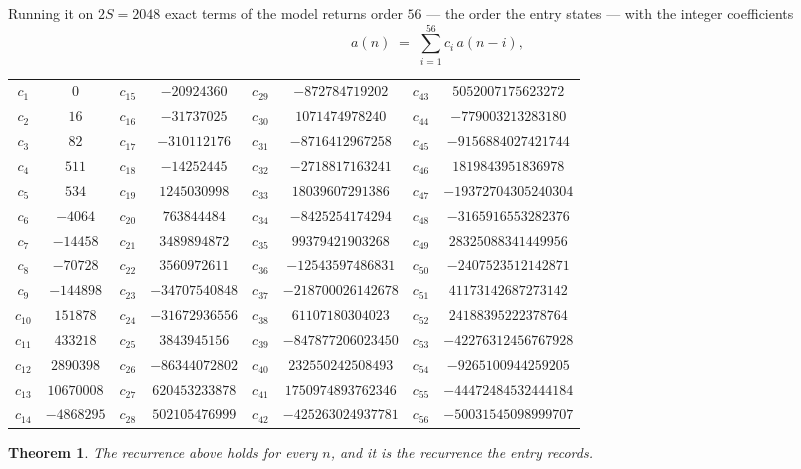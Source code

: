 \documentclass[11pt,a4paper]{article}
\theoremstyle{plain}
\newtheorem{theorem}{Theorem}
\theoremstyle{definition}
\begin{document}
Running it on $2S=2048$ exact terms of the model returns order $56$ --- the order the
entry states --- with the integer coefficients
\[
a(n)\;=\;\sum_{i=1}^{56}c_i\,a(n-i),
\]
\begin{center}\small
\begin{tabular}{cccccccc}
$c_{1}$ & $0$ & $c_{15}$ & $-20924360$ & $c_{29}$ & $-872784719202$ & $c_{43}$ & $5052007175623272$ \\
$c_{2}$ & $16$ & $c_{16}$ & $-31737025$ & $c_{30}$ & $1071474978240$ & $c_{44}$ & $-779003213283180$ \\
$c_{3}$ & $82$ & $c_{17}$ & $-310112176$ & $c_{31}$ & $-8716412967258$ & $c_{45}$ & $-9156884027421744$ \\
$c_{4}$ & $511$ & $c_{18}$ & $-14252445$ & $c_{32}$ & $-2718817163241$ & $c_{46}$ & $1819843951836978$ \\
$c_{5}$ & $534$ & $c_{19}$ & $1245030998$ & $c_{33}$ & $18039607291386$ & $c_{47}$ & $-19372704305240304$ \\
$c_{6}$ & $-4064$ & $c_{20}$ & $763844484$ & $c_{34}$ & $-8425254174294$ & $c_{48}$ & $-3165916553282376$ \\
$c_{7}$ & $-14458$ & $c_{21}$ & $3489894872$ & $c_{35}$ & $99379421903268$ & $c_{49}$ & $28325088341449956$ \\
$c_{8}$ & $-70728$ & $c_{22}$ & $3560972611$ & $c_{36}$ & $-12543597486831$ & $c_{50}$ & $-2407523512142871$ \\
$c_{9}$ & $-144898$ & $c_{23}$ & $-34707540848$ & $c_{37}$ & $-218700026142678$ & $c_{51}$ & $41173142687273142$ \\
$c_{10}$ & $151878$ & $c_{24}$ & $-31672936556$ & $c_{38}$ & $61107180304023$ & $c_{52}$ & $24188395222378764$ \\
$c_{11}$ & $433218$ & $c_{25}$ & $3843945156$ & $c_{39}$ & $-847877206023450$ & $c_{53}$ & $-42276312456767928$ \\
$c_{12}$ & $2890398$ & $c_{26}$ & $-86344072802$ & $c_{40}$ & $232550242508493$ & $c_{54}$ & $-9265100944259205$ \\
$c_{13}$ & $10670008$ & $c_{27}$ & $620453233878$ & $c_{41}$ & $1750974893762346$ & $c_{55}$ & $-44472484532444184$ \\
$c_{14}$ & $-4868295$ & $c_{28}$ & $502105476999$ & $c_{42}$ & $-425263024937781$ & $c_{56}$ & $-50031545098999707$ \\
\end{tabular}
\end{center}

\begin{theorem}
The recurrence above holds for every $n$, and it is the recurrence the entry records.
\end{theorem}
\end{document}
